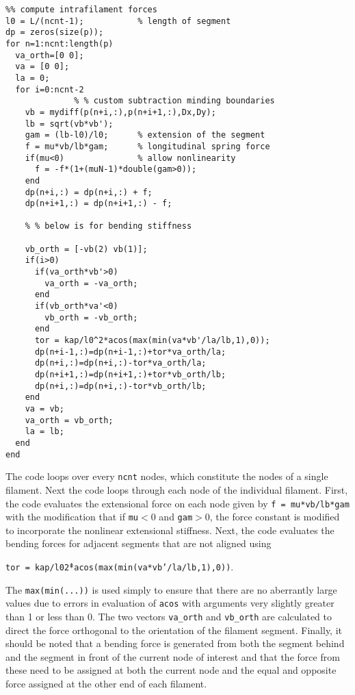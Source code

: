 \begin{verbatim}
%% compute intrafilament forces    
l0 = L/(ncnt-1);           % length of segment
dp = zeros(size(p));
for n=1:ncnt:length(p)
  va_orth=[0 0];
  va = [0 0];
  la = 0;
  for i=0:ncnt-2
			  % % custom subtraction minding boundaries
    vb = mydiff(p(n+i,:),p(n+i+1,:),Dx,Dy); 
    lb = sqrt(vb*vb');
    gam = (lb-l0)/l0;      % extension of the segment
    f = mu*vb/lb*gam;      % longitudinal spring force
    if(mu<0)               % allow nonlinearity
      f = -f*(1+(muN-1)*double(gam>0));
    end
    dp(n+i,:) = dp(n+i,:) + f;
    dp(n+i+1,:) = dp(n+i+1,:) - f;
    
    % % below is for bending stiffness
    
    vb_orth = [-vb(2) vb(1)];
    if(i>0)
      if(va_orth*vb'>0)
        va_orth = -va_orth;
      end
      if(vb_orth*va'<0)
        vb_orth = -vb_orth;
      end
      tor = kap/l0^2*acos(max(min(va*vb'/la/lb,1),0));
      dp(n+i-1,:)=dp(n+i-1,:)+tor*va_orth/la;
      dp(n+i,:)=dp(n+i,:)-tor*va_orth/la;
      dp(n+i+1,:)=dp(n+i+1,:)+tor*vb_orth/lb;
      dp(n+i,:)=dp(n+i,:)-tor*vb_orth/lb;
    end
    va = vb;
    va_orth = vb_orth;
    la = lb;
  end
end
\end{verbatim}

The code loops over every \texttt{ncnt} nodes, which constitute the nodes of a single filament.  Next the code loops through each node of the individual filament.  First, the code evaluates the extensional force on each node given by \texttt{f = mu*vb/lb*gam} with the modification that if \texttt{mu}$<0$ and \texttt{gam}$>0$, the force constant is modified to incorporate the nonlinear extensional stiffness.  Next, the code evaluates the bending forces for adjacent segments that are not aligned using 

\texttt{tor = kap/l0\^2*acos(max(min(va*vb'/la/lb,1),0))}. 

 The \texttt{max(min(...))} is used simply to ensure that there are no aberrantly large values due to errors in evaluation of \texttt{acos} with arguments very slightly greater than 1 or less than 0.   The two vectors \texttt{va\_orth} and \texttt{vb\_orth} are calculated to direct the force orthogonal to the orientation of the filament segment.  Finally, it should be noted that a bending force is generated from both the segment behind and the segment in front of the current node of interest and that the force from these need to be assigned at both the current node and the equal and opposite force assigned at the other end of each filament.


